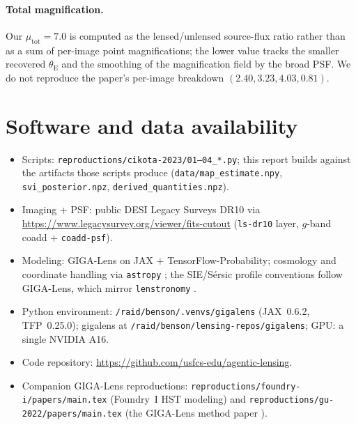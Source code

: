 \documentclass[11pt,letterpaper]{article}
\newcommand{\thetaE}{\ensuremath{\theta_{\mathrm{E}}}}
\begin{document}
\paragraph{Total magnification.} Our $\mu_{\mathrm{tot}}=7.0$ is computed
as the lensed/unlensed source-flux ratio rather than as a sum of
per-image point magnifications; the lower value tracks the smaller
recovered $\thetaE$ and the smoothing of the magnification field by the
broad PSF. We do not reproduce the paper's per-image breakdown
$(2.40, 3.23, 4.03, 0.81)$.

\section{Software and data availability}

\begin{itemize}
\item Scripts: \texttt{reproductions/cikota-2023/01--04\_*.py}; this
      report builds against the artifacts those scripts produce
      (\texttt{data/map\_estimate.npy}, \texttt{svi\_posterior.npz},
      \texttt{derived\_quantities.npz}).
\item Imaging + PSF: public DESI Legacy Surveys DR10
      \autocite{dey2019legacy} via
      \url{https://www.legacysurvey.org/viewer/fits-cutout} (\texttt{ls-dr10}
      layer, $g$-band coadd $+$ \texttt{coadd-psf}).
\item Modeling: GIGA-Lens \autocite{gu2022gigalens} on JAX
      \autocite{jax2018} $+$ TensorFlow-Probability; cosmology and
      coordinate handling via \texttt{astropy} \autocite{astropy2022};
      the SIE/S\'ersic profile conventions follow GIGA-Lens, which mirror
      \texttt{lenstronomy} \autocite{birrer2018lenstronomy}.
\item Python environment: \texttt{/raid/benson/.venvs/gigalens}
      (JAX~0.6.2, TFP~0.25.0); gigalens at
      \texttt{/raid/benson/lensing-repos/gigalens}; GPU: a single NVIDIA
      A16.
\item Code repository: \url{https://github.com/usfcs-edu/agentic-lensing}.
\item Companion GIGA-Lens reproductions:
      \texttt{reproductions/foundry-i/papers/main.tex} (Foundry~I HST
      modeling) and \texttt{reproductions/gu-2022/papers/main.tex}
      (the GIGA-Lens method paper \autocite{gu2022gigalens}).
\end{itemize}
\end{document}
